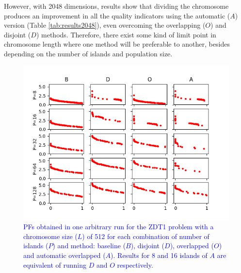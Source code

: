 \documentclass[preprint]{elsarticle}
\begin{document}
However, with 2048 dimensions, results show that dividing the chromosome produces an improvement in all the quality indicators using the automatic ($A$) version (Table \ref{tab:results2048}), even overcoming the overlapping ($O$) and disjoint ($D$) methods. Therefore, there exist some kind of limit point in chromosome length where one method will be preferable to another, besides depending on the number of islands and population size.

\begin{figure}
\centering
\includegraphics[width=12cm]{plot_zdt1_512.png}
\caption{\textcolor{blue}{PFs obtained in one arbitrary run for the ZDT1 problem with a chromosome size ($L$) of 512 for each combination of number of islands ($P$) and method: baseline ($B$), disjoint ($D$), overlapped ($O$) and automatic overlapped ($A$). Results for 8 and 16 islands of $A$ are equivalent of running $D$ and $O$ respectively. }}
\label{fig:plot_zdt1_512}
\end{figure}
\end{document}
